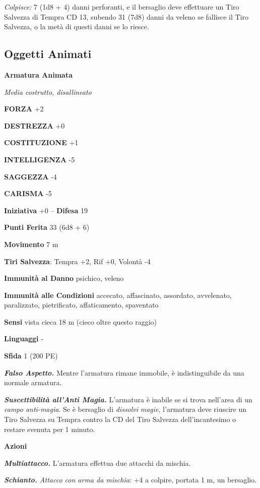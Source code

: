 \begin{multicols}{2}
\emph{Colpisce:} 7 (1d8 + 4) danni perforanti, e il bersaglio deve effettuare un Tiro Salvezza di Tempra CD 13, subendo 31 (7d8) danni da veleno se fallisce il Tiro Salvezza, o la metà di questi danni se lo riesce.

\subsection{Oggetti Animati}

\medskip{}\textbf{Armatura Animata}

\emph{Media costrutto, disallineato}

\textbf{FORZA} +2

\textbf{DESTREZZA} +0

\textbf{COSTITUZIONE} +1

\textbf{INTELLIGENZA} -5

\textbf{SAGGEZZA} -4

\textbf{CARISMA} -5

\textbf{Iniziativa} +0 -- \textbf{Difesa} 19

\textbf{Punti Ferita} 33 (6d8 + 6)

\textbf{Movimento} 7 m

\textbf{Tiri Salvezza}: Tempra +2, Rif +0, Volontà -4

\textbf{Immunità al Danno} psichico, veleno

\textbf{Immunità alle Condizioni} accecato, affascinato, assordato, avvelenato, paralizzato, pietrificato, affaticamento, spaventato

\textbf{Sensi} vista cieca 18 m (cieco oltre questo raggio)

\textbf{Linguaggi} -

\textbf{Sfida} 1 (200 PE)

\emph{\textbf{Falso Aspetto.}} Mentre l'armatura rimane immobile, è indistinguibile da una normale armatura.

\emph{\textbf{Suscettibilità all'Anti Magia.}} L'armatura è inabile se si trova nell'area di un \emph{campo anti-magia}. Se è bersaglio di \emph{dissolvi} \emph{magie}, l'armatura deve riuscire un Tiro Salvezza su Tempra contro la CD del Tiro Salvezza dell'incantesimo o restare svenuta per 1 minuto.

\textbf{Azioni}

\emph{\textbf{Multiattacco.}} L'armatura effettua due attacchi da mischia.

\emph{\textbf{Schianto.} Attacco con arma da mischia}: +4 a colpire, portata 1 m, un bersaglio.


\end{multicols}
